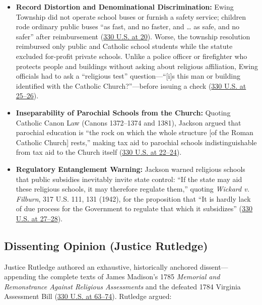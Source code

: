 \documentclass[12pt]{article}
\begin{document}
\begin{itemize}
  \item \textbf{Record Distortion and Denominational Discrimination:} Ewing Township did not operate school buses or furnish a safety service; children rode ordinary public buses ``as fast, and no faster, and \ldots{} as safe, and no safer'' after reimbursement (\href{https://supreme.justia.com/cases/federal/us/330/1/}{330 U.S. at 20}). Worse, the township resolution reimbursed only public and Catholic school students while the statute excluded for-profit private schools. Unlike a police officer or firefighter who protects people and buildings without asking about religious affiliation, Ewing officials had to ask a ``religious test'' question---``[i]s this man or building identified with the Catholic Church?''---before issuing a check (\href{https://supreme.justia.com/cases/federal/us/330/1/}{330 U.S. at 25--26}).
  \item \textbf{Inseparability of Parochial Schools from the Church:} Quoting Catholic Canon Law (Canons 1372--1374 and 1381), Jackson argued that parochial education is ``the rock on which the whole structure [of the Roman Catholic Church] rests,'' making tax aid to parochial schools indistinguishable from tax aid to the Church itself (\href{https://supreme.justia.com/cases/federal/us/330/1/}{330 U.S. at 22--24}).
  \item \textbf{Regulatory Entanglement Warning:} Jackson warned religious schools that public subsidies inevitably invite state control: ``If the state may aid these religious schools, it may therefore regulate them,'' quoting \emph{Wickard v. Filburn}, 317 U.S. 111, 131 (1942), for the proposition that ``It is hardly lack of due process for the Government to regulate that which it subsidizes'' (\href{https://supreme.justia.com/cases/federal/us/330/1/}{330 U.S. at 27--28}).
\end{itemize}

\subsection{Dissenting Opinion (Justice Rutledge)}

Justice Rutledge authored an exhaustive, historically anchored dissent---appending the complete texts of James Madison's 1785 \emph{Memorial and Remonstrance Against Religious Assessments} and the defeated 1784 Virginia Assessment Bill (\href{https://supreme.justia.com/cases/federal/us/330/1/}{330 U.S. at 63--74}). Rutledge argued:
\end{document}
